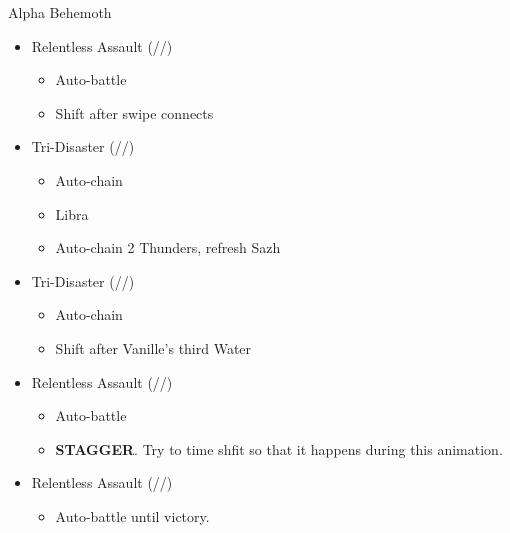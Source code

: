 	\renewcommand{\first}{[1] Relentless Assault (\com/\rav/\rav)}
	\renewcommand{\second}{[2] Tri-Disaster (\rav/\rav/\rav)}
	\renewcommand{\third}{[3]  Relentless Assault (\com/\rav/\rav)}
	\renewcommand{\fourth}{[4] Tri-Disaster (\rav/\rav/\rav)}

	\vfill
	

	\begin{battle}[0:40]{Alpha Behemoth}
		\begin{itemize}
			\item \first
			      \begin{itemize}
				      \item Auto-battle
				      \item Shift after swipe connects
			      \end{itemize}
			\item \second
			      \begin{itemize}
				      \item Auto-chain
				      \item Libra
				      \item Auto-chain 2 Thunders, refresh Sazh
			      \end{itemize}
			\item \fourth
			      \begin{itemize}
				      \item Auto-chain
				      \item Shift after Vanille's third Water
			      \end{itemize}
			\item \first
			      \begin{itemize}
				      \item Auto-battle
				      \item \textbf{STAGGER}. Try to time shfit so that it happens during this animation.
			      \end{itemize}
			\item \third
			      \begin{itemize}
				      \item Auto-battle until victory.
			      \end{itemize}
		\end{itemize}
	\end{battle}
	\vfill
	\ 


	

